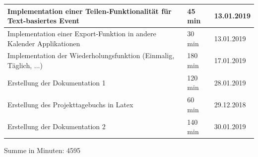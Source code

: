 \begin{longtable}{|p{10cm}|p{2cm}|p{2cm}|}
Implementation einer Teilen-Funktionalität für Text-basiertes Event & 45 min & 13.01.2019 \\ \hline
Implementation einer Export-Funktion in andere Kalender Applikationen & 30 min & 13.01.2019 \\ \hline
Implementation der Wiederholungsfunktion (Einmalig, Täglich, ...) & 180 min & 17.01.2019 \\ \hline
Erstellung der Dokumentation 1 & 120 min & 28.01.2019 \\ \hline
Erstellung des Projekttagebuchs in Latex & 60 min & 29.12.2018 \\ \hline
Erstellung der Dokumentation 2 & 140 min & 30.01.2019 \\ \hline
\end{longtable}
Summe in Minuten: 4595

\newpage
